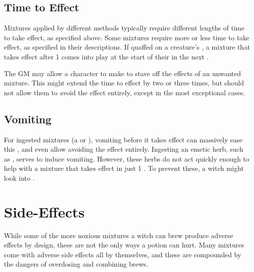 

\subsection{Time to Effect}

Mixtures applied by different methods typically require different lengths of time to take effect, as specified above.
Some mixtures require more or less time to take effect, as specified in their descriptions.
If quaffed on a creature's {\turn}, a mixture that takes effect after 1 {\round} comes into play at the start of their {\turn} in the next {\round}.

The GM may allow a character to make  {\tests} to stave off the effects of an unwanted mixture.
This might extend the time to effect by two or three times, but should not allow them to avoid the effect entirely, except in the most exceptional cases.

\subsection{Vomiting}

For ingested mixtures (a  or ), vomiting before it takes effect can massively ease this  {\test}, and even allow avoiding the effect entirely.
Ingesting an emetic herb, such as , serves to induce vomiting.
However, these herbs do not act quickly enough to help with a mixture that takes effect in just 1 {\round}.
To prevent these, a witch might look into .

\section{Side-Effects}

While some of the more noxious mixtures a witch can brew produce adverse effects by design, these are not the only ways a potion can hurt.
Many mixtures come with adverse side effects all by themselves, and these are compounded by the dangers of overdosing and combining brews.

